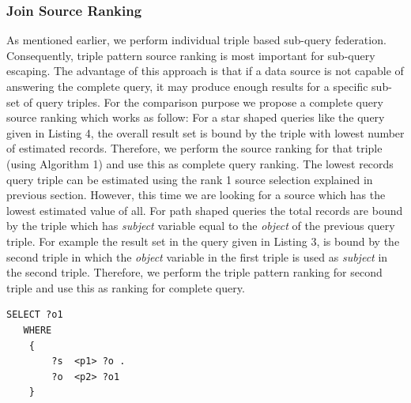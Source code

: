 \documentclass{sig-alternate}  %
\begin{document}
\subsubsection{Join Source Ranking}
 As mentioned earlier, we perform individual triple based sub-query federation. Consequently, triple pattern source ranking is most important for sub-query escaping. The advantage of this approach is that if a data source is not capable of answering the complete query, it may produce enough results for a specific sub-set of query triples. For the comparison purpose we propose a complete query source ranking which works as follow: For a star shaped queries like the query given in Listing 4, the overall result set is bound by the triple with lowest number of estimated records. Therefore, we perform the source ranking for that triple (using Algorithm 1) and use this as complete query ranking. The lowest records query triple can be estimated using the rank 1 source selection explained in previous section. However, this time we are looking for a source which has the lowest estimated value of all. For path shaped queries the total records are bound by the triple which has \emph{subject} variable equal to the \emph{object} of the previous query triple. For example the result set in the query given in Listing 3, is bound by the second triple in which the \emph{object} variable in the first triple is used as \emph{subject} in the second triple. Therefore, we perform the triple pattern ranking for second triple and use this as ranking for complete query.
\begin{lstlisting}[caption = {A P-1 query example},basicstyle={\tiny},frame = {single},language=SPARQL,stringstyle={\ttfamily}]
 SELECT ?o1 
   WHERE
    {
        ?s  <p1> ?o .
        ?o  <p2> ?o1
    }
\end{lstlisting}
\end{document}
